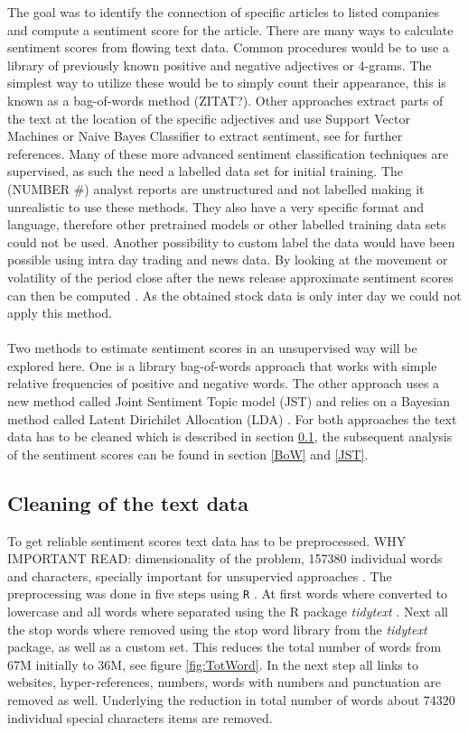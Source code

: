 The goal was to identify the connection of specific articles to listed companies and compute a sentiment score for the article. There are many ways to calculate sentiment scores from flowing text data. Common procedures would be to use a library of previously known positive and negative adjectives or 4-grams. The simplest way to utilize these would be to simply count their appearance, this is known as a bag-of-words method (ZITAT?). Other approaches extract parts of the text at the location of the specific adjectives and use Support Vector Machines or Naive Bayes Classifier to extract sentiment, see \citet{westerski2007sentiment} for further references. Many of these more advanced sentiment classification techniques are supervised, as such the need a labelled data set for initial training. The (NUMBER \#) analyst reports are unstructured and not labelled making it unrealistic to use these methods. They also have a very specific format and language, therefore other pretrained models or other labelled training data sets could not be used. Another possibility to custom label the data would have been possible using intra day trading and news data. By looking at the movement or volatility of the period close after the news release approximate sentiment scores can then be computed \citep{robertson2007news}. As the obtained stock data is only inter day we could not apply this method.
\\ \\
Two methods to estimate sentiment scores in an unsupervised way will be explored here. One is a library bag-of-words approach that works with simple relative frequencies of positive and negative words. The other approach uses a new method called Joint Sentiment Topic model (JST) \citep{lin2009joint} and relies on a Bayesian method called Latent Dirichilet Allocation (LDA)  \citep{blei2003latent}. For both approaches the text data has to be cleaned which is described in section \ref{cleaningText}, the subsequent analysis of the sentiment scores can be found in section \ref{BoW} and \ref{JST}.

\subsection{Cleaning of the text data}\label{cleaningText}
To get reliable sentiment scores text data has to be preprocessed. WHY IMPORTANT READ: dimensionality of the problem, 157380 individual words and characters,  specially important for unsupervied approaches \citep{HADDI201326}. The preprocessing was done in five steps using \texttt{R} \citep{Rproject}. At first words where converted to lowercase and all words where separated using the R package \textit{tidytext} \citep{tidytext}. Next all the stop words where removed using the stop word library from the \textit{tidytext} package, as well as a custom set. This reduces the total number of words from 67M initially to 36M, see figure \ref{fig:TotWord}. In the next step all links to websites, hyper-references, numbers, words with numbers and punctuation are removed as well. Underlying the reduction in total number of words about 74320 individual special characters items are removed. 

